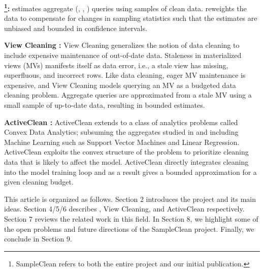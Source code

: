 \vspace{0.5em}
\noindent \textbf{\sampleclean \cite{wang1999sample} \footnote{SampleClean refers to both the entire project and our initial publication.}: } \sampleclean estimates aggregate (\sumfunc, \countfunc, \avgfunc) queries using samples of clean data. \sampleclean reweights the data to compensate for changes in sampling statistics such that the estimates are unbiased and bounded in confidence intervals.

\vspace{0.5em}
\noindent \textbf{View Cleaning \cite{krishnan2015svc}: } View Cleaning generalizes the notion of data cleaning to include expensive maintenance of out-of-date data. Staleness in materialized views (MVs) manifests itself as data error, i.e., a stale view has missing, superfluous, and incorrect rows.
Like data cleaning, eager MV maintenance is expensive, and View Cleaning models querying an MV as a budgeted data cleaning problem.
Aggregate queries are approximated from a stale MV using a small sample of up-to-date data, resulting in bounded estimates.

\vspace{0.5em}
\noindent \textbf{ActiveClean \cite{krishnan2015acl}: } ActiveClean extends \sampleclean to a class of analytics problems called Convex Data Analytics; subsuming the aggregates studied in \sampleclean and including Machine Learning such as Support Vector Machines and Linear Regression. ActiveClean exploits the convex structure of the problem to prioritize cleaning data that is likely to affect the model. ActiveClean directly integrates cleaning into the model training loop and as a result gives a bounded approximation for a given cleaning budget.

\vspace{0.5em}

This article is organized as follows. Section 2 introduces the project and its main ideas. Section 4/5/6 describes \sampleclean, View Cleaning, and ActiveClean respectively. Section 7 reviews the related work in this field. In Section 8, we highlight some of the open problems and future directions of the SampleClean project. Finally, we conclude in Section 9.